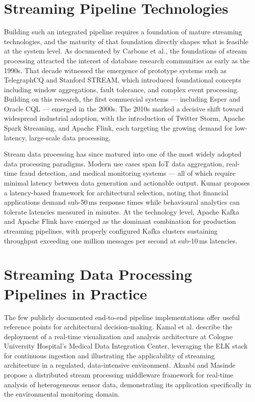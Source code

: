 \section{Streaming Pipeline Technologies}
Building such an integrated pipeline requires a foundation of mature streaming technologies, and the maturity of that foundation directly shapes what is feasible at the system level. As documented by Carbone et al.\cite{carbone2020beyond}, the foundations of stream processing attracted the interest of database research communities as early as the 1990s. That decade witnessed the emergence of prototype systems such as TelegraphCQ and Stanford STREAM, which introduced foundational concepts including window aggregations, fault tolerance, and complex event processing\cite{carbone2020beyond}. Building on this research, the first commercial systems — including Esper and Oracle CQL — emerged in the 2000s. The 2010s marked a decisive shift toward widespread industrial adoption, with the introduction of Twitter Storm, Apache Spark Streaming, and Apache Flink, each targeting the growing demand for low-latency, large-scale data processing.

Stream data processing has since matured into one of the most widely adopted data processing paradigms. Modern use cases span IoT data aggregation, real-time fraud detection, and medical monitoring systems — all of which require minimal latency between data generation and actionable output. Kumar proposes a latency-based framework for architectural selection, noting that financial applications demand sub-50\,ms response times while behavioural analytics can tolerate latencies measured in minutes\cite{kumar2025evolution}. At the technology level, Apache Kafka and Apache Flink have emerged as the dominant combination for production streaming pipelines, with properly configured Kafka clusters sustaining throughput exceeding one million messages per second at sub-10\,ms latencies\cite{kumar2025evolution}.

\section{Streaming Data Processing Pipelines in Practice}

The few publicly documented end-to-end pipeline implementations offer useful reference points for architectural decision-making. Kamal et al.\cite{kamal2024realtime} describe the deployment of a real-time visualization and analysis architecture at Cologne University Hospital's Medical Data Integration Center, leveraging the ELK stack for continuous ingestion and illustrating the applicability of streaming architecture in a regulated, data-intensive environment. Akanbi and Masinde\cite{akanbi2020distributed} propose a distributed stream processing middleware framework for real-time analysis of heterogeneous sensor data, demonstrating its application specifically in the environmental monitoring domain.

